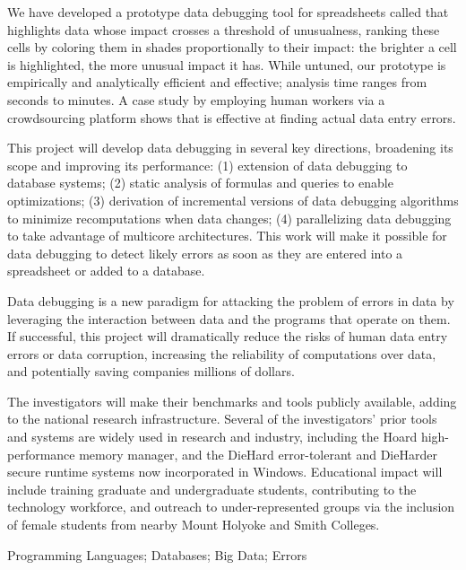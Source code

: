 We have developed a prototype data debugging tool for spreadsheets called
\checkcell{} that
 highlights data whose impact crosses a threshold of unusualness,
ranking these cells by coloring them in shades proportionally to their
impact: the brighter a cell is highlighted, the more unusual impact it
has.  While untuned, our prototype is empirically and analytically
efficient and effective; analysis time ranges from seconds to minutes.
A case study by employing human workers via a crowdsourcing platform
shows that \checkcell{} is effective at
finding actual data entry errors.

This project will develop data debugging in several key directions,
broadening its scope and improving its performance: (1) extension of
data debugging to database systems; (2) static analysis of formulas
and queries to enable optimizations; (3) derivation of incremental
versions of data debugging algorithms to minimize recomputations when
data changes; (4) parallelizing data debugging to take advantage of
multicore architectures. This work will make it possible for data
debugging to detect likely errors as soon as they are entered into a
spreadsheet or added to a database.

\smallskip
{}
Data debugging is a new paradigm for attacking the problem of errors
in data by leveraging the interaction between data and the programs
that operate on them.  If successful, this project will dramatically
reduce the risks of human data entry errors or data corruption,
increasing the reliability of computations over data, and potentially
saving companies millions of dollars.

The investigators will make their benchmarks and tools publicly
available, adding to the national research infrastructure. Several of
the investigators' prior tools and systems are widely used in research
and industry, including the Hoard high-performance memory manager, and the
DieHard error-tolerant and DieHarder secure runtime systems now
incorporated in Windows. Educational impact will include training
graduate and undergraduate students, contributing to the technology
workforce, and outreach to under-represented groups via the inclusion
of female students from nearby Mount Holyoke and Smith Colleges.

\smallskip
{} Programming Languages; Databases; Big Data; Errors
